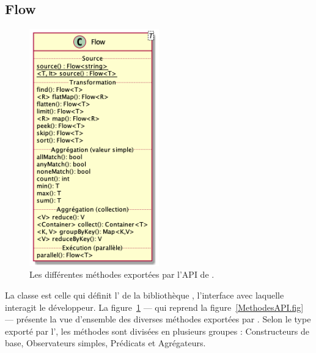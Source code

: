 \subsection{Flow}

\begin{figure}
\centering
     \includegraphics[width=0.5\textwidth]{Figures/flow-details.png}
      \caption{Les diff\'erentes m\'ethodes export\'ees par l'API de .}
       \label{Flow.fig}
\end{figure}





La classe  est celle qui définit l' de la biblioth\`eque , l'interface avec laquelle interagit le d\'eveloppeur. La figure~\ref{Flow.fig} --- qui reprend la figure~\ref{MethodesAPI.fig} --- pr\'esente la vue d'ensemble des diverses m\'ethodes export\'ees par . Selon le type export\'e par l', les m\'ethodes sont divis\'ees en plusieurs groupes : Constructeurs de base, Observateurs simples, Pr\'edicats et Agr\'egateurs.

